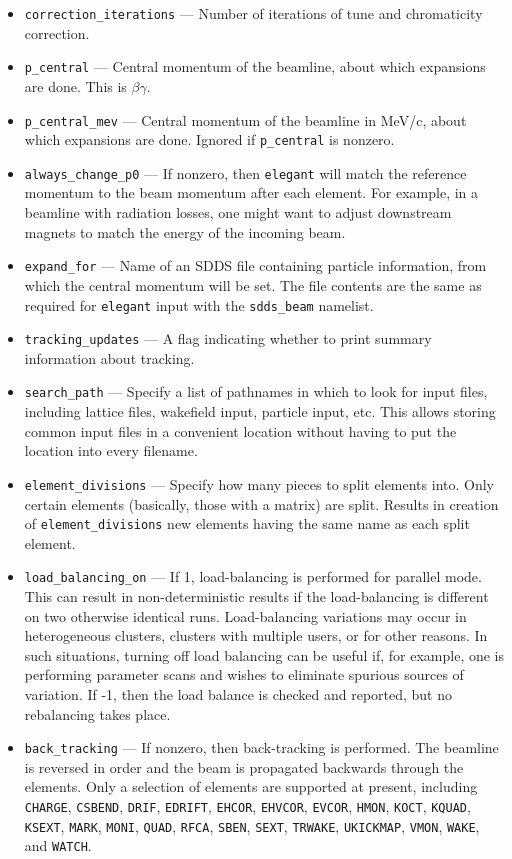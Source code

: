 \documentclass[11pt]{article}
\begin{document}
\begin{itemize}
\item \verb|correction_iterations| --- Number of iterations of tune and chromaticity correction.
\item \verb|p_central| --- Central momentum of the beamline, about which expansions are done.
        This is $\beta\gamma$.
\item \verb|p_central_mev| --- Central momentum of the beamline in
MeV/c, about which expansions are done.  Ignored if \verb|p_central| is nonzero.
\item \verb|always_change_p0| --- If nonzero, then {\tt elegant} will match the reference momentum to
  the beam momentum after each element.  For example, in a beamline with radiation losses, one might
  want to adjust downstream magnets to match the energy of the incoming beam.
\item \verb|expand_for| --- Name of an SDDS file containing particle information, from which the central
momentum will be set.  The file contents are the same as required for {\tt elegant} input with the \verb|sdds_beam| namelist.
\item \verb|tracking_updates| --- A flag indicating whether to print summary information about
tracking.
\item \verb|search_path| --- Specify a list of pathnames in which to look for input files,
 including lattice files, wakefield input, particle input, etc.  This allows storing common
 input files in a convenient location without having to put the location into every filename.
\item \verb|element_divisions| --- Specify how many pieces to split elements into.  Only 
 certain elements (basically, those with a matrix) are split.  Results in creation of 
 \verb|element_divisions| new elements having the same name as each split element.
\item \verb|load_balancing_on| --- If 1, load-balancing is performed for parallel mode.
 This can result in non-deterministic results if the load-balancing is different on two
 otherwise identical runs.  Load-balancing variations may occur in heterogeneous clusters,
 clusters with multiple users, or for other reasons.  In such situations, turning off 
 load balancing can be useful if, for example, one is performing parameter scans and
 wishes to eliminate spurious sources of variation.
 If -1, then the load balance is checked and reported, but no rebalancing takes place.
\item \verb|back_tracking| --- If nonzero, then back-tracking is performed. The beamline is reversed in
  order and the beam is propagated backwards through the elements. Only a selection of elements are supported at
  present, including \verb|CHARGE|, \verb|CSBEND|, \verb|DRIF|, \verb|EDRIFT|, \verb|EHCOR|, \verb|EHVCOR|,
  \verb|EVCOR|, \verb|HMON|, \verb|KOCT|, \verb|KQUAD|, \verb|KSEXT|, \verb|MARK|, \verb|MONI|, \verb|QUAD|, \verb|RFCA|, 
  \verb|SBEN|, \verb|SEXT|, \verb|TRWAKE|, \verb|UKICKMAP|, \verb|VMON|, \verb|WAKE|, and \verb|WATCH|.
\end{itemize}
\end{document}
